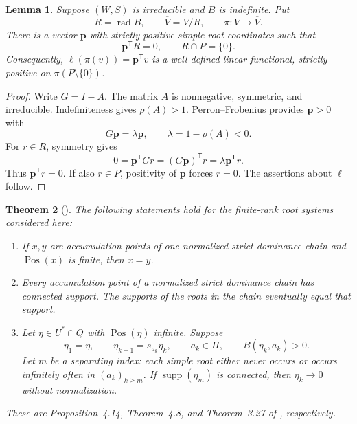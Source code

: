 \documentclass[11pt,reqno]{amsart}
\theoremstyle{plain}
\newtheorem{theorem}{Theorem}[section]
\newtheorem{lemma}[theorem]{Lemma}
\theoremstyle{definition}
\theoremstyle{remark}
\numberwithin{equation}{section}
\DeclareMathOperator{\supp}{supp}
\DeclareMathOperator{\Pos}{Pos}
\DeclareMathOperator{\rad}{rad}
\begin{document}
\begin{lemma}\label{lem:radical-positive}
Suppose $(W,S)$ is irreducible and $B$ is indefinite. Put
\[
R=\rad B,\qquad\overline V=V/R,\qquad\pi:V\longrightarrow\overline V.
\]
There is a vector $\mathbf p$ with strictly positive simple-root coordinates such that
\[
\mathbf p^{\mathsf T}R=0,\qquad R\cap P=\{0\}.
\]
Consequently, $\ell(\pi(v))=\mathbf p^{\mathsf T}v$ is a well-defined linear functional, strictly positive on $\pi(P\setminus\{0\})$.
\end{lemma}
\begin{proof}
Write $G=I-A$. The matrix $A$ is nonnegative, symmetric, and irreducible. Indefiniteness gives $\rho(A)>1$. Perron--Frobenius provides $\mathbf p>0$ with
\[
G\mathbf p=\lambda\mathbf p,\qquad\lambda=1-\rho(A)<0.
\]
For $r\in R$, symmetry gives
\[
0=\mathbf p^{\mathsf T}Gr=(G\mathbf p)^{\mathsf T}r
=\lambda\mathbf p^{\mathsf T}r.
\]
Thus $\mathbf p^{\mathsf T}r=0$. If also $r\in P$, positivity of $\mathbf p$ forces $r=0$. The assertions about $\ell$ follow.
\end{proof}

\begin{theorem}[\cite{FuEtAl2026}]\label{thm:descent-inputs}
The following statements hold for the finite-rank root systems considered here:
\begin{enumerate}[label=(\alph*)]
\item If $x,y$ are accumulation points of one normalized strict dominance chain and $\Pos(x)$ is finite, then $x=y$.
\item Every accumulation point of a normalized strict dominance chain has connected support. The supports of the roots in the chain eventually equal that support.
\item Let $\eta\in U^*\cap Q$ with $\Pos(\eta)$ infinite. Suppose
\[
\eta_1=\eta,\qquad\eta_{k+1}=s_{a_k}\eta_k,\qquad
 a_k\in\Pi,\qquad B(\eta_k,a_k)>0.
\]
Let $m$ be a separating index: each simple root either never occurs or occurs infinitely often in $(a_k)_{k\geq m}$. If $\supp(\eta_m)$ is connected, then $\eta_k\to0$ without normalization.
\end{enumerate}
These are Proposition~4.14, Theorem~4.8, and Theorem~3.27 of \cite{FuEtAl2026}, respectively.
\end{theorem}
\end{document}
